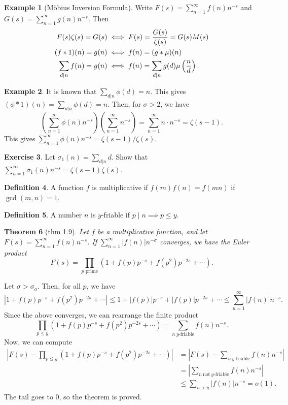 \documentclass[11pt]{article}
\newtheorem{thm}{Theorem}[subsection]
\theoremstyle{definition}
\newtheorem{defn}[thm]{Definition}
\newtheorem{example}[thm]{Example}
\newtheorem{exe}[thm]{Exercise}
\newcommand{\s}[0]{\sigma}
\newcommand{\abs}[1]{\left\lvert#1\right\rvert} %
\begin{document}
\begin{example}[M\"obius Inversion Formula]
Write $F(s)=\sum_{n=1}^\infty f(n)n^{-s}$ and $G(s)=\sum_{n=1}^\infty g(n)n^{-s}$. Then
\begin{align}
F(s)\zeta(s) = G(s) &\iff F(s) = \frac{G(s)}{\zeta(s)} = G(s)M(s) \notag \\
(f*1)(n) = g(n) &\iff f(n) = (g*\mu)(n) \notag \\
\sum_{d|n} f(n) = g(n) &\iff f(n) = \sum_{d|n} g(d)\mu\left(\frac{n}{d}\right) .
\label{mobius inversion formula}
\end{align}
\end{example}

\begin{example}
It is known that $\sum_{d|n}\phi(d)=n$. This gives $(\phi*1)(n)=\sum_{d|n}\phi(d)=n$. Then,
for $\s>2$, we have
\[
\left(\sum_{n=1}^\infty \phi(n)n^{-s}\right) \left(\sum_{n=1}^\infty n^{-s}\right)
= \sum_{n=1}^\infty n\cdot n^{-s} = \zeta(s-1) .
\]
This gives $\sum_{n=1}^\infty\phi(n)n^{-s}=\zeta(s-1)/\zeta(s)$.
\end{example}

\begin{exe}
Let $\sigma_1(n)=\sum_{d|n}d$. Show that
$\sum_{n=1}^\infty\sigma_1(n)n^{-s}=\zeta(s-1)\zeta(s)$.
\end{exe}

\begin{defn}
A function $f$ is multiplicative if $f(m)f(n)=f(mn)$ if $\gcd(m,n)=1$.
\end{defn}

\begin{defn}
A number $n$ is $y$-friable if $p\mid n \implies p\le y$.
\end{defn}

\begin{thm}[thm 1.9]\label{thm:1.9}
Let $f$ be a multiplicative function, and let $F(s)=\sum_{n=1}^\infty f(n)n^{-s}$. If
$\sum_{n=1}^\infty\abs{f(n)}n^{-\s}$ converges, we have the Euler product
\[
  F(s) = \prod_{p\text{ prime}} (1 + f(p)p^{-s} + f(p^2)p^{-2s} + \cdots) .
\]
\end{thm}
\proof
Let $\s>\s_a$. Then, for all $p$, we have
\[
\abs{1 + f(p)p^{-s} + f(p^2)p^{-2s} + \cdots}
\le 1 + \abs{f(p)}p^{-s} + \abs{f(p)}p^{-2s} + \cdots
\le \sum_{n=1}^\infty \abs{f(n)}n^{-s} .
\]
Since the above converges, we can rearrange the finite product
\[
\prod_{p\le y} (1 + f(p)p^{-s} + f(p^2)p^{-2s} + \cdots)
= \sum_{n~y\text{-friable}} f(n)n^{-s} .
\]
Now, we can compute
\begin{align*}
\abs{F(s) - \prod_{p\le y} (1 + f(p)p^{-s} + f(p^2)p^{-2s} + \cdots)}
&= \abs{F(s) - \sum_{n~y\text{-friable}} f(n)n^{-s}} \\
&= \abs{\sum_{n~\text{not}~y\text{-friable}} f(n)n^{-s}} \\
&\le \sum_{n>y} \abs{f(n)}n^{-s} = o(1) .
\end{align*}
The tail goes to 0, so the theorem is proved.
\qedhere
\end{document}
